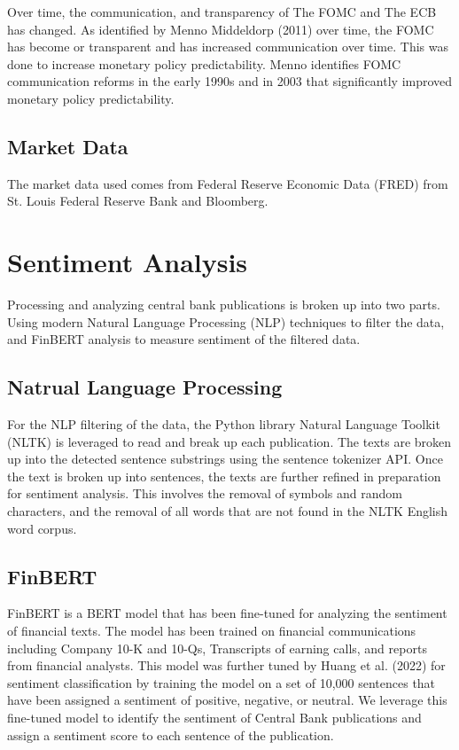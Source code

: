 \documentclass[12pt, letterpaper]{article}
\begin{document}
Over time, the communication, and transparency of The FOMC and The ECB has changed. As identified by Menno Middeldorp (2011) over time, the FOMC has become or transparent and has increased communication over time. 
This was done to increase monetary policy predictability. 
Menno identifies FOMC communication reforms in the early 1990s and in 2003 that significantly improved monetary policy predictability. 

\subsection{Market Data}
The market data used comes from Federal Reserve Economic Data (FRED) from St. Louis Federal Reserve Bank and Bloomberg. 

\section{Sentiment Analysis}
Processing and analyzing central bank publications is broken up into two parts. 
Using modern Natural Language Processing (NLP) techniques to filter the data, and FinBERT analysis to measure sentiment of the filtered data. 

\subsection{Natrual Language Processing}
For the NLP filtering of the data, the Python library Natural Language Toolkit (NLTK) is leveraged to read and break up each publication. 
The texts are broken up into the detected sentence substrings using the sentence tokenizer API. 
Once the text is broken up into sentences, the texts are further refined in preparation for sentiment analysis. 
This involves the removal of symbols and random characters, and the removal of all words that are not found in the NLTK English word corpus.  

\subsection{FinBERT}
FinBERT is a BERT model that has been fine-tuned for analyzing the sentiment of financial texts. 
The model has been trained on financial communications including Company 10-K and 10-Qs, Transcripts of earning calls, and reports from financial analysts. 
This model was further tuned by Huang et al. (2022) for sentiment classification by training the model on a set of 10,000 sentences that have been assigned a sentiment of positive, negative, or neutral. 
We leverage this fine-tuned model to identify the sentiment of Central Bank publications and assign a sentiment score to each sentence of the publication. 
\end{document}
